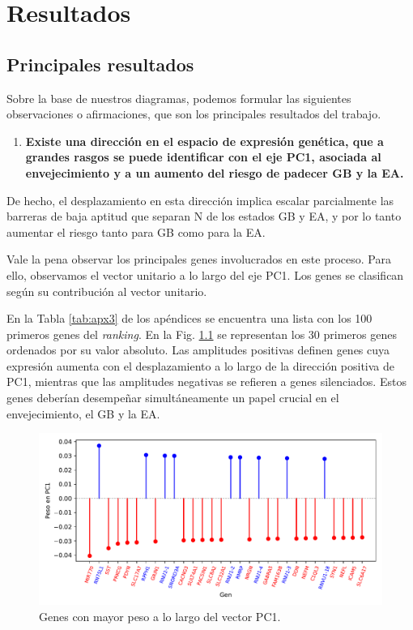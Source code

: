 \chapter{Resultados}
\label{cap3}
\onehalfspacing

\section{Principales resultados}

Sobre la base de nuestros diagramas, podemos formular las siguientes observaciones o afirmaciones, que son los principales resultados del trabajo.

\begin{enumerate}
	\item  \textbf{Existe una dirección en el espacio de expresión genética, que a grandes rasgos se puede identificar con el eje PC1, asociada al envejecimiento y a un aumento del riesgo de padecer GB y la EA.}
\end{enumerate}

De hecho, el desplazamiento en esta dirección implica escalar parcialmente las barreras de baja aptitud que separan N de los estados GB y EA, y por lo tanto aumentar el riesgo tanto para GB como para la EA.

Vale la pena observar los principales genes involucrados en este proceso. Para ello, observamos el vector unitario a lo largo del eje PC1. Los genes se clasifican según su contribución al vector unitario.%

En la Tabla \ref{tab:apx3} de los apéndices se encuentra una lista con los 100 primeros genes del \textit{ranking}. En la Fig. \ref{fig:figpc1} se representan los 30 primeros genes ordenados por su valor absoluto. Las amplitudes positivas definen genes cuya expresión aumenta con el desplazamiento a lo largo de la dirección positiva de PC1, mientras que las amplitudes negativas se refieren a genes silenciados. Estos genes deberían desempeñar simultáneamente un papel crucial en el envejecimiento, el GB y la EA.

\begin{figure}[!htb]
	\centering
	\includegraphics[width=\linewidth]{figures/PC1}
	\caption{Genes con mayor peso a lo largo del vector PC1.}
	\label{fig:figpc1}
\end{figure}

